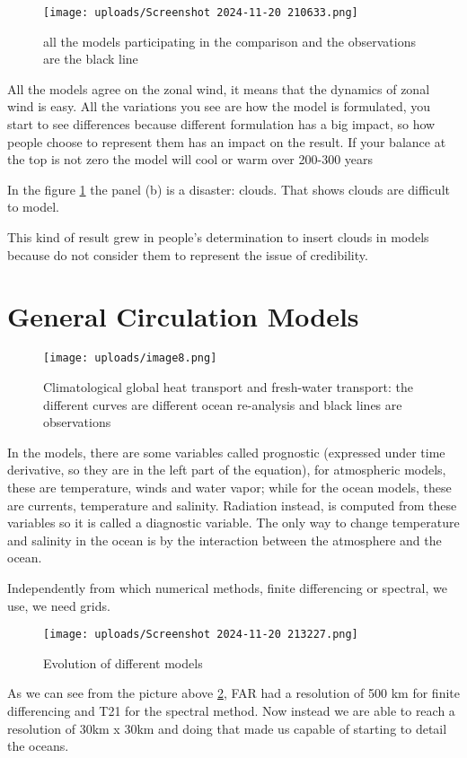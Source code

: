 \begin{figure}[htp!]
	\centering
	\texttt{[image: uploads/Screenshot 2024-11-20 210633.png]}
	\caption{all the models participating in the comparison and the observations are the black line}
	\label{fig:9}
\end{figure}
All the models agree on the zonal wind, it means that the dynamics of zonal wind is easy. All the variations you see are how the model is formulated, you start to see differences because different formulation has a big impact, so how people choose to represent them has an impact on the result.
If your balance at the top is not zero the model will cool or warm over 200-300 years

In the figure \ref{fig:9} the panel (b) is a disaster: clouds. That shows clouds are difficult to model.



This kind of result grew in people's determination to insert clouds in models because do not consider them to represent the issue of credibility.


\section{General Circulation Models }
\begin{figure}[htpb]
	\centering
	\texttt{[image: uploads/image8.png]}
	\caption{Climatological global heat transport and fresh-water transport: the different curves are different ocean re-analysis and black lines are observations}

\end{figure}
In the models, there are some variables called prognostic (expressed under time derivative, so they are in the left part of the equation), for atmospheric models, these are temperature, winds and water vapor; while for the ocean models, these are currents, temperature and salinity. Radiation instead, is computed from these variables so it is called a diagnostic variable.
The only way to change temperature and salinity in the ocean is by the interaction between the atmosphere and the ocean.

Independently from which numerical methods, finite differencing or spectral, we use, we need grids.
\begin{figure}[htp!]
	\centering
	\texttt{[image: uploads/Screenshot 2024-11-20 213227.png]}
	\caption{Evolution of different models}
	\label{fig:grids evolution}

\end{figure}
As we can see from the picture above \ref{fig:grids evolution}, FAR had a resolution of 500 km for finite differencing and T21 for the spectral method. Now instead we are able to reach a resolution of 30km x 30km and doing that made us capable of starting to detail the oceans.

